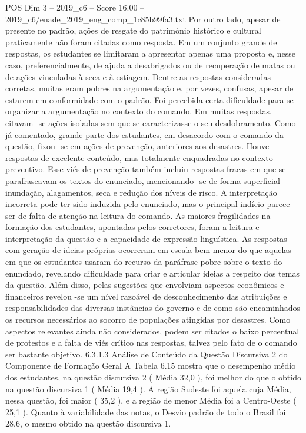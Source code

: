 \begin{textsample}{POS Dim 3 – 2019\_c6 – Score 16.00 – 2019\_c6/enade\_2019\_eng\_comp\_1c85b99fa3.txt}
Por outro lado, apesar de presente no padrão, ações de resgate do patrimônio histórico e cultural praticamente não foram citadas como resposta.
Em um conjunto grande de respostas, os estudantes se limitaram a apresentar apenas uma proposta e, nesse caso, preferencialmente, de ajuda a desabrigados ou de recuperação de matas ou de ações vinculadas à seca e à estiagem.
Dentre as respostas consideradas corretas, muitas eram pobres na argumentação e, por vezes, confusas, apesar de estarem em conformidade com o padrão.
Foi percebida certa dificuldade para se organizar a argumentação no contexto do comando.
Em muitas respostas, citavam -se ações isoladas sem que se caracterizasse o seu desdobramento.
Como já comentado, grande parte dos estudantes, em desacordo com o comando da questão, fixou -se em ações de prevenção, anteriores aos desastres.
Houve respostas de excelente conteúdo, mas totalmente enquadradas no contexto preventivo.
Esse viés de prevenção também incluiu respostas fracas em que se parafraseavam os textos do enunciado, mencionando -se de forma superficial inundação, alagamentos, seca e redução dos níveis de risco.
A interpretação incorreta pode ter sido induzida pelo enunciado, mas o principal indício parece ser de falta de atenção na leitura do comando.
As maiores fragilidades na formação dos estudantes, apontadas pelos corretores, foram a leitura e interpretação da questão e a capacidade de expressão linguística.
As respostas com geração de ideias próprias ocorreram em escala bem menor do que aquelas em que os estudantes usaram do recurso da paráfrase pobre sobre o texto do enunciado, revelando dificuldade para criar e articular ideias a respeito dos temas da questão.
Além disso, pelas sugestões que envolviam aspectos econômicos e financeiros revelou -se um nível razoável de desconhecimento das atribuições e responsabilidades das diversas instâncias do governo e de como são encaminhados os recursos necessários ao socorro de populações atingidas por desastres.
Como aspectos relevantes ainda não considerados, podem ser citados o baixo percentual de protestos e a falta de viés crítico nas respostas, talvez pelo fato de o comando ser bastante objetivo. 6.3.1.3 Análise de Conteúdo da Questão Discursiva 2 do Componente de Formação Geral A Tabela 6.15 mostra que o desempenho médio dos estudantes, na questão discursiva 2 ( Média 32,0 ), foi melhor do que o obtido na questão discursiva 1 ( Média 19,4 ).
A região Sudeste foi aquela cuja Média, nessa questão, foi maior ( 35,2 ), e a região de menor Média foi a Centro-Oeste ( 25,1 ).
Quanto à variabilidade das notas, o Desvio padrão de todo o Brasil foi 28,6, o mesmo obtido na questão discursiva 1.

\end{textsample}
